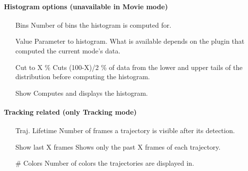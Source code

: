 \documentclass[11pt,onside]{report}
\numberwithin{equation}{chapter}
\begin{document}
\paragraph{Histogram options (unavailable in \textsf{Movie} mode)}
\begin{itemize}[leftmargin=3cm]
\item[\textsf{Bins}] Number of bins the histogram is computed for.
\item[\textsf{Value}] Parameter to histogram. What is available depends on the plugin that computed the current mode's data.
\item[\textsf{Cut to X \%}] Cuts (100-X)/2 \% of data from the lower and upper tails of the distribution before computing the histogram. 
\item[\textsf{Show}] Computes and displays the histogram.
\end{itemize}

\paragraph{Tracking related (only \textsf{Tracking} mode)}
\begin{itemize}[leftmargin=3.5cm]
\item[\textsf{Traj. Lifetime}] Number of frames a trajectory is visible after its detection.
\item[\textsf{Show last X frames}] Shows only the past X frames of each trajectory.
\item[\textsf{\# Colors}] Number of colors the trajectories are displayed in. 
\end{itemize}

\clearpage
\end{document}

